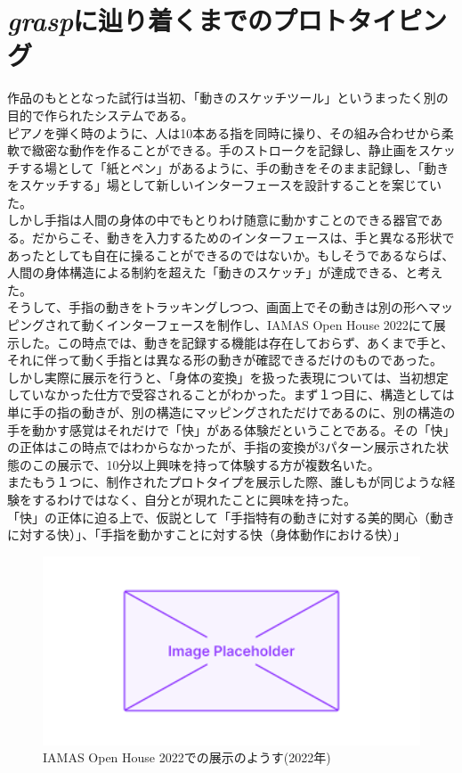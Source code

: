 \section{\textit{grasp}に辿り着くまでのプロトタイピング}
作品のもととなった試行は当初、「動きのスケッチツール」というまったく別の目的で作られたシステムである。\\
ピアノを弾く時のように、人は10本ある指を同時に操り、その組み合わせから柔軟で緻密な動作を作ることができる。手のストロークを記録し、静止画をスケッチする場として「紙とペン」があるように、手の動きをそのまま記録し、「動きをスケッチする」場として新しいインターフェースを設計することを案じていた。\\
しかし手指は人間の身体の中でもとりわけ随意に動かすことのできる器官である。だからこそ、動きを入力するためのインターフェースは、手と異なる形状であったとしても自在に操ることができるのではないか。もしそうであるならば、人間の身体構造による制約を超えた「動きのスケッチ」が達成できる、と考えた。\\
そうして、手指の動きをトラッキングしつつ、画面上でその動きは別の形へマッピングされて動くインターフェースを制作し、IAMAS Open House 2022にて展示した。この時点では、動きを記録する機能は存在しておらず、あくまで手と、それに伴って動く手指とは異なる形の動きが確認できるだけのものであった。\\
しかし実際に展示を行うと、「身体の変換」を扱った表現については、当初想定していなかった仕方で受容されることがわかった。まず１つ目に、構造としては単に手の指の動きが、別の構造にマッピングされただけであるのに、別の構造の手を動かす感覚はそれだけで「快」がある体験だということである。その「快」の正体はこの時点ではわからなかったが、手指の変換が3パターン展示された状態のこの展示で、10分以上興味を持って体験する方が複数名いた。\\
またもう１つに、制作されたプロトタイプを展示した際、誰しもが同じような経験をするわけではなく、自分とが現れたことに興味を持った。\\
「快」の正体に迫る上で、仮説として「手指特有の動きに対する美的関心（動きに対する快）」、「手指を動かすことに対する快（身体動作における快）」

\begin{figure}[H]
  \centering
  \includegraphics[width=15cm]{img/placeholder.png}
  \caption{IAMAS Open House 2022での展示のようす(2022年)}
  \label{fig:exhibit_2022}
\end{figure}

